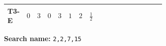 \documentclass[8pt]{article}
\begin{document}
\begin{landscape}
\begin{longtable}{@{}llcccccc >{\raggedright\arraybackslash}p{0.21\linewidth} >{\raggedright\arraybackslash}p{0.21\linewidth} >{\raggedright\arraybackslash}p{0.21\linewidth}@{}}
T3-E & $0$ & $3$ & $0$ & $3$ & $1$ & $2$ & $\frac{1}{2}$ & \scriptsize\adjustbox{max width=\linewidth}{$\begin{gathered} \frac{\sqrt{3} g_{2}^{2} \overline{y_{1}} \overline{y_{2}}}{6 MF}\end{gathered}$} & \scriptsize\adjustbox{max width=\linewidth}{$\begin{gathered} - \frac{49 \sqrt{3} i g_{2}^{2} \overline{y_{1}} \overline{y_{2}}}{24 MF}\end{gathered}$} & \scriptsize\adjustbox{max width=\linewidth}{$\begin{gathered} - \frac{3 \sqrt{11} i lambda12Inv2 \overline{y_{1}} \overline{y_{2}}}{22 MF}\end{gathered}$} \\
\midrule
\bottomrule
\end{longtable}
\clearpage
\noindent\textbf{Search name: }\texttt{2,2,7,15}\par\smallskip

\end{landscape}
\end{document}
